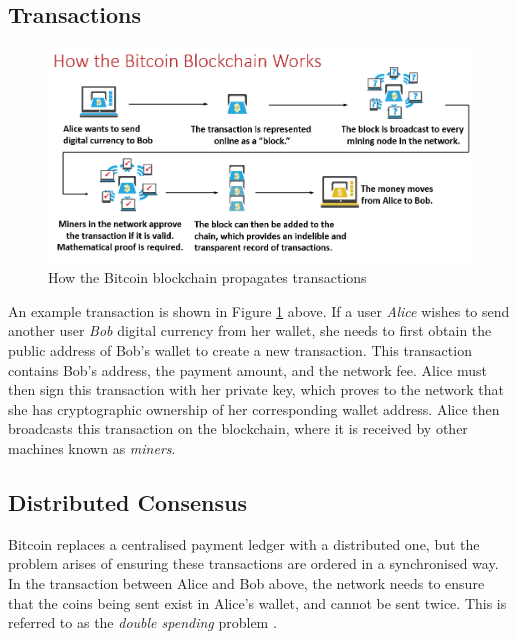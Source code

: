 \subsection{Transactions}
\begin{figure}[ht]
\centering
     \includegraphics[width=1.0\textwidth]{./images/BitcoinTransaction.png}
      \caption[How the Bitcoin blockchain propagates transactions]{How the Bitcoin blockchain propagates transactions \protect\footnotemark}
       \label{fig:bitcoin-transaction}
\end{figure}

An example transaction is shown in Figure \ref{fig:bitcoin-transaction} above. If a user \textit{Alice} wishes to send another user \textit{Bob} digital currency from her wallet, she needs to first obtain the public address of Bob's wallet to create a new transaction. This transaction contains Bob's address, the payment amount, and the network fee. Alice must then sign this transaction with her private key, which proves to the network that she has cryptographic ownership of her corresponding wallet address. Alice then broadcasts this transaction on the blockchain, where it is received by other machines known as \textit{miners}.

\subsection{Distributed Consensus}
Bitcoin replaces a centralised payment ledger with a distributed one, but the problem arises of ensuring these transactions are ordered in a synchronised way. In the transaction between Alice and Bob above, the network needs to ensure that the coins being sent exist in Alice's wallet, and cannot be sent twice. This is referred to as the \textit{double spending} problem \cite{hoepman_distributed_2007}. 

